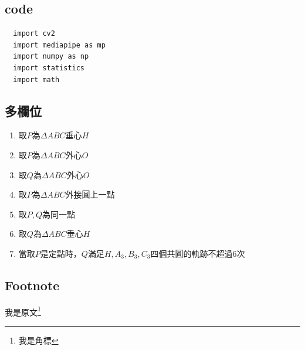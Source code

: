 \subsection{code}

\begin{lstlisting}
  import cv2
  import mediapipe as mp
  import numpy as np
  import statistics
  import math
\end{lstlisting}

\subsection{多欄位}
\begin{multicols}{2}
  \begin{enumerate}[label=(\roman*)]
  \item 取$P$為$\Delta ABC$垂心$H$
  \item {\color{blue}取$P$為$\Delta ABC$外心$O$}
  \item {\color[RGB]{0,255,200}取$Q$為$\Delta ABC$外心$O$}
  \item 取$P$為$\Delta ABC$外接圓上一點
  \item 取$P,Q$為同一點
  \item 取$Q$為$\Delta ABC$垂心$H$
  \item 當取$P$是定點時，$Q$滿足$H,A_3,B_3,C_3$四個共圓的軌跡不超過6次
  \end{enumerate}
\end{multicols}

\subsection{Footnote}
  我是原文\footnote{我是角標}



\newpage
